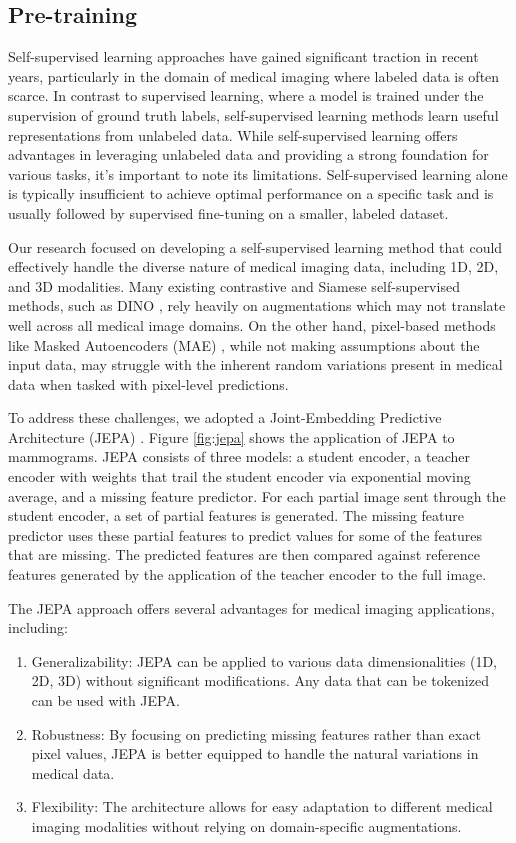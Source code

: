 \documentclass[12pt]{article}
\begin{document}
\subsection{Pre-training}

Self-supervised learning approaches have gained significant traction in recent years, particularly in the domain of medical imaging where labeled data is often scarce. 
In contrast to supervised learning, where a model is trained under the supervision of ground truth labels,
self-supervised learning methods learn useful representations from unlabeled data. 
While self-supervised learning offers advantages in leveraging unlabeled data and providing a strong foundation for various tasks, it's important to note its limitations. Self-supervised learning alone is typically insufficient to achieve optimal performance on a specific task and is usually followed by supervised fine-tuning on a smaller, labeled dataset.

Our research focused on developing a self-supervised learning method that could effectively handle the diverse nature of medical imaging data, including 1D, 2D, and 3D modalities.
Many existing contrastive and Siamese self-supervised methods, such as DINO \cite{caron2021emerging}, rely heavily on augmentations which may not translate well across all medical image domains. On the other hand, pixel-based methods like Masked Autoencoders (MAE) \cite{he2022masked}, while not making assumptions about the input data, may struggle with the inherent random variations present in medical data when tasked with pixel-level predictions.

To address these challenges, we adopted a Joint-Embedding Predictive Architecture (JEPA) \cite{assran2023self}. 
Figure \ref{fig:jepa} shows the application of JEPA to mammograms.
JEPA consists of three models: a student encoder, a teacher encoder with weights that trail the student encoder via exponential moving average, and a missing feature predictor.
For each partial image sent through the student encoder, a set of partial features is generated.
The missing feature predictor uses these partial features to predict values for some of the
features that are missing.
The predicted features are then compared against reference features generated by the application of the teacher encoder to the full image.

The JEPA approach offers several advantages for medical imaging applications, including:
\begin{enumerate}
    \item Generalizability: JEPA can be applied to various data dimensionalities (1D, 2D, 3D) without significant modifications.
      Any data that can be tokenized can be used with JEPA.
    \item Robustness: By focusing on predicting missing features rather than exact pixel values, JEPA is better equipped to handle the natural variations in medical data.
    \item Flexibility: The architecture allows for easy adaptation to different medical imaging modalities without relying on domain-specific augmentations.
\end{enumerate}
\end{document}
